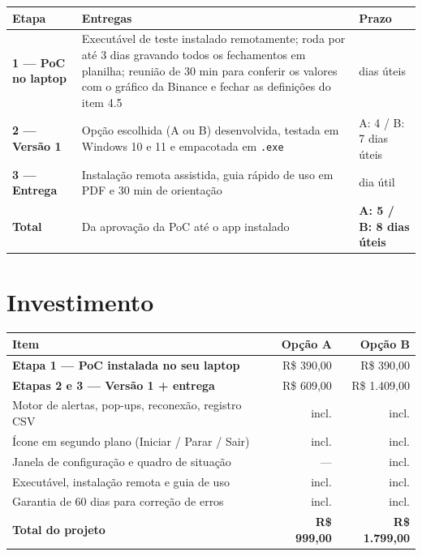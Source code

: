 \documentclass[11pt,a4paper]{article}
\newcommand{\valPoc}{390,00}
\newcommand{\valA}{999,00}
\newcommand{\valB}{1.799,00}
\newcommand{\valAsaldo}{609,00}
\newcommand{\valBsaldo}{1.409,00}
\begin{document}
\begin{center}
\small
\renewcommand{\arraystretch}{1.35}
\begin{tabularx}{\textwidth}{@{}>{\bfseries\leavevmode\color{navymid}}p{30mm} X >{\raggedleft\arraybackslash}p{32mm}@{}}
  \toprule
  \rowcolor{navy!8}
  \textbf{\color{black}Etapa} & \textbf{Entregas} & \textbf{Prazo} \\
  \midrule
  1 --- PoC no laptop & Executável de teste instalado remotamente; roda por até 3 dias gravando todos os
    fechamentos em planilha; reunião de 30 min para conferir os valores com o gráfico da Binance e
    fechar as definições do item 4.5 & 2 dias úteis \\
  2 --- Versão 1 & Opção escolhida (A ou B) desenvolvida, testada em Windows 10 e 11 e empacotada em \texttt{.exe} & A: 4 / B: 7 dias úteis \\
  3 --- Entrega & Instalação remota assistida, guia rápido de uso em PDF e 30 min de orientação & 1 dia útil \\
  \midrule
  \rowcolor{gold!12}
  \textbf{\color{black}Total} & Da aprovação da PoC até o app instalado & \textbf{A: 5 / B: 8 dias úteis} \\
  \bottomrule
\end{tabularx}
\end{center}

\section{Investimento}

\begin{center}
\renewcommand{\arraystretch}{1.45}
\begin{tabularx}{\textwidth}{@{}X r r@{}}
  \toprule
  \rowcolor{navy!8}
  \textbf{Item} & \textbf{Opção A} & \textbf{Opção B} \\
  \midrule
  \textbf{Etapa 1 --- PoC instalada no seu laptop}      & R\$ \valPoc & R\$ \valPoc \\
  \textbf{Etapas 2 e 3 --- Versão 1 + entrega}          & R\$ \valAsaldo & R\$ \valBsaldo \\
  \quad Motor de alertas, pop-ups, reconexão, registro CSV & incl. & incl. \\
  \quad Ícone em segundo plano (Iniciar / Parar / Sair)   & incl. & incl. \\
  \quad Janela de configuração e quadro de situação       & ---   & incl. \\
  \quad Executável, instalação remota e guia de uso       & incl. & incl. \\
  \quad Garantia de 60 dias para correção de erros        & incl. & incl. \\
  \midrule
  \rowcolor{navy!14}
  \textbf{\large Total do projeto} & \textbf{\large R\$ \valA} & \textbf{\large R\$ \valB} \\
  \bottomrule
\end{tabularx}
\end{center}
\end{document}

